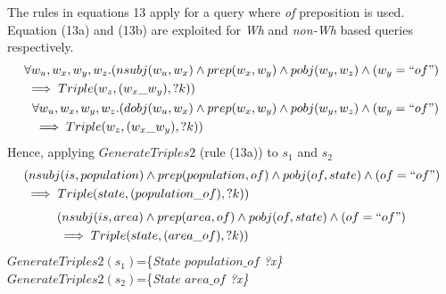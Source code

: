 \documentclass[review]{elsarticle}
\begin{document}
The rules in equations 13  apply for a query where \textit{of} preposition is used.  Equation (13a) and (13b) are exploited for  \textit{Wh}   and  \textit{non-Wh} based queries respectively.
\begin{subequations}
\begin{align}
\begin{split}
 &\forall   w_u,w_x,w_y,w_z.(nsubj(w_u,w_x)\land prep(w_x,w_y)\land pobj(w_y,w_z)\land(w_y= ``of")\\
 &\implies Triple(w_z,(w_x\_w_y), ?k))
\end{split}\\
\begin{split}
 &\forall   w_u,w_x,w_y,w_z.(dobj(w_u,w_x)\land prep(w_x,w_y)\land pobj(w_y,w_z)\land(w_y=``of")\\
 &\implies Triple(w_z,(w_x\_w_y), ?k))\\
\end{split}
\end{align}
\end{subequations}
Hence, applying $GenerateTriples2$ (rule (13a)) to $s_1$ and $s_2$\\
\begin{equation*}
\begin{split}
 &(nsubj(is, population)\land prep(population,of)\land pobj(of,state)\land(of= ``of")\\
 &\implies Triple(state,(population\_of), ?k))
 \end{split}
\end{equation*}
\begin{equation*}
\begin{split}
 &(nsubj(is, area)\land prep(area,of)\land pobj(of,state)\land(of= ``of")\\
 &\implies Triple(state,(area\_of), ?k))
 \end{split}
\end{equation*}
$GenerateTriples2(s_1)$=\{\textit{State $population\_of$ ?x\}}\\
$GenerateTriples2(s_2)$=\{\textit{State $area\_of$ ?x\}}\\
\end{document}
